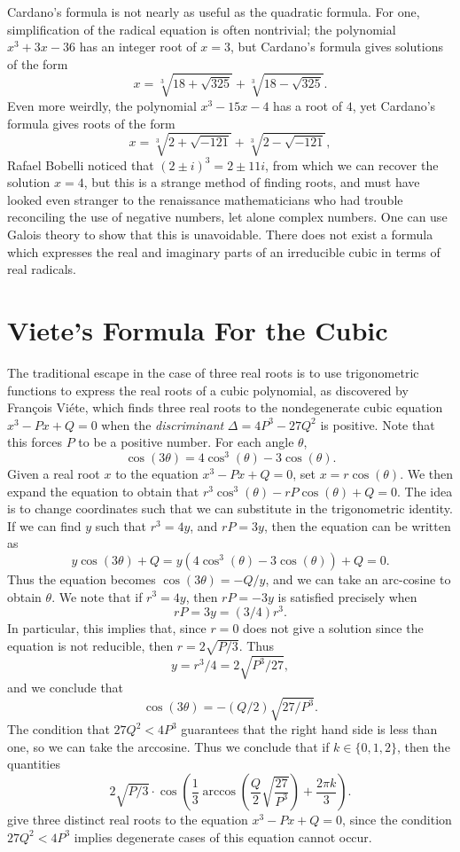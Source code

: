 Cardano's formula is not nearly as useful as the quadratic formula. For one, simplification of the radical equation is often nontrivial; the polynomial $x^3 + 3x - 36$ has an integer root of $x = 3$, but Cardano's formula gives solutions of the form
%
\[ x = \sqrt[3]{18 + \sqrt{325}} + \sqrt[3]{18 - \sqrt{325}}. \]
%
Even more weirdly, the polynomial $x^3 - 15x - 4$ has a root of $4$, yet Cardano's formula gives roots of the form
%
\[ x = \sqrt[3]{2 + \sqrt{-121}} + \sqrt[3]{2 - \sqrt{-121}}, \]
%
Rafael Bobelli noticed that $(2 \pm i)^3 = 2 \pm 11 i$, from which we can recover the solution $x = 4$, but this is a strange method of finding roots, and must have looked even stranger to the renaissance mathematicians who had trouble reconciling the use of negative numbers, let alone complex numbers. One can use Galois theory to show that this is unavoidable. There does not exist a formula which expresses the real and imaginary parts of an irreducible cubic in terms of real radicals.

\section{Viete's Formula For the Cubic}

The traditional escape in the case of three real roots is to use trigonometric functions to express the real roots of a cubic polynomial, as discovered by Fran\c{c}ois Vi\'{e}te, which finds three real roots to the nondegenerate cubic equation $x^3 - Px + Q = 0$ when the \emph{discriminant} $\Delta = 4P^3 - 27Q^2$ is positive. Note that this forces $P$ to be a positive number. For each angle $\theta$,
%
\[ \cos(3 \theta) = 4 \cos^3(\theta) - 3 \cos(\theta). \]
%
Given a real root $x$ to the equation $x^3 - Px + Q = 0$, set $x = r \cos(\theta)$. We then expand the equation to obtain that $r^3 \cos^3(\theta) - r P \cos(\theta) + Q = 0$. The idea is to change coordinates such that we can substitute in the trigonometric identity. If we can find $y$ such that $r^3 = 4y$, and $rP = 3y$, then the equation can be written as
%
\[ y \cos(3 \theta) + Q = y(4 \cos^3(\theta) - 3 \cos(\theta)) + Q = 0. \]
%
Thus the equation becomes $\cos(3\theta) = -Q/y$, and we can take an arc-cosine to obtain $\theta$. We note that if $r^3 = 4y$, then $rP = -3y$ is satisfied precisely when
%
\[ rP = 3y = (3/4)r^3. \]
%
In particular, this implies that, since $r = 0$ does not give a solution since the equation is not reducible, then $r = 2 \sqrt{P/3}$. Thus
%
\[ y = r^3/4 = 2 \sqrt{P^3/27}, \]
%
and we conclude that
%
\[ \cos(3\theta) = - (Q/2) \sqrt{27/P^3}. \]
%
The condition that $27 Q^2 < 4P^3$ guarantees that the right hand side is less than one, so we can take the arccosine. Thus we conclude that if $k \in \{ 0, 1 , 2 \}$, then the quantities
%
\[ 2 \sqrt{P/3} \cdot \cos \left( \frac{1}{3} \arccos \left( \frac{Q}{2} \sqrt{\frac{27}{P^3}} \right) + \frac{2 \pi k}{3} \right). \]
%
give three distinct real roots to the equation $x^3 - Px + Q = 0$, since the condition $27Q^2 < 4P^3$ implies degenerate cases of this equation cannot occur.

